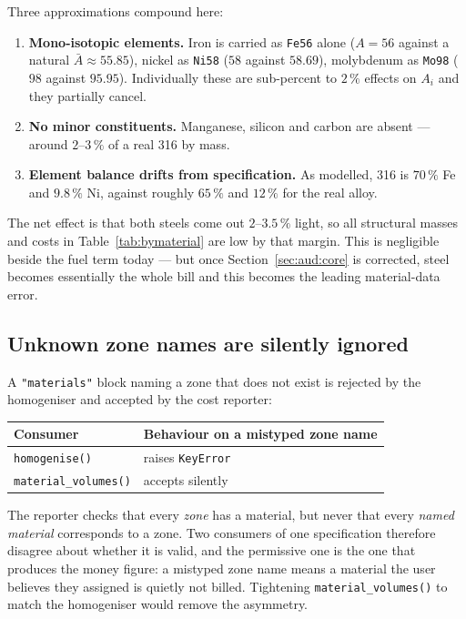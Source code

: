 \documentclass[9pt,a4paper]{extarticle}
\newcommand{\code}[1]{\texttt{\small #1}}
\begin{document}
Three approximations compound here:

\begin{enumerate}
  \item \textbf{Mono-isotopic elements.} Iron is carried as \code{Fe56} alone
        ($A=56$ against a natural $\bar{A}\approx55.85$), nickel as \code{Ni58}
        ($58$ against $58.69$), molybdenum as \code{Mo98} ($98$ against
        $95.95$). Individually these are sub-percent to $2\,\%$ effects on $A_i$
        and they partially cancel.
  \item \textbf{No minor constituents.} Manganese, silicon and carbon are absent
        --- around $2$--$3\,\%$ of a real 316 by mass.
  \item \textbf{Element balance drifts from specification.} As modelled, 316 is
        $70\,\%$ Fe and $9.8\,\%$ Ni, against roughly $65\,\%$ and $12\,\%$ for
        the real alloy.
\end{enumerate}

The net effect is that both steels come out $2$--$3.5\,\%$ light, so all
structural masses and costs in Table~\ref{tab:bymaterial} are low by that
margin. This is negligible beside the fuel term today --- but once
Section~\ref{sec:aud:core} is corrected, steel becomes essentially the whole
bill and this becomes the leading material-data error.

\subsection{Unknown zone names are silently ignored}
\label{sec:aud:zones}

A \code{"materials"} block naming a zone that does not exist is rejected by the
homogeniser and accepted by the cost reporter:

\begin{center}\footnotesize
\begin{tabular}{@{}ll@{}}
\toprule
\textbf{Consumer} & \textbf{Behaviour on a mistyped zone name} \\
\midrule
\code{homogenise()}        & raises \code{KeyError} \\
\code{material\_volumes()} & accepts silently \\
\bottomrule
\end{tabular}
\end{center}

The reporter checks that every \emph{zone} has a material, but never that every
\emph{named material} corresponds to a zone. Two consumers of one specification
therefore disagree about whether it is valid, and the permissive one is the one
that produces the money figure: a mistyped zone name means a material the user
believes they assigned is quietly not billed. Tightening
\code{material\_volumes()} to match the homogeniser would remove the asymmetry.
\end{document}
